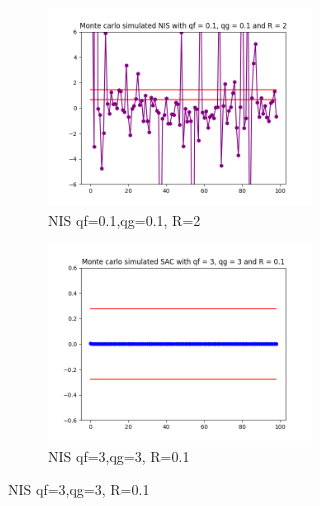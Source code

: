 \documentclass{article}
\begin{document}
\begin{figure}[H]
\begin{subfigure} {1\textwidth}
\begin{subfigure}{.3\textwidth}
                    \includegraphics[width=1\linewidth]{./img/mc/nis01r2.png}
                    \caption{NIS qf=0.1,qg=0.1, R=2}
                \end{subfigure}
                \begin{subfigure}{.3\textwidth}
                    \includegraphics[width=1\linewidth]{./img/mc/nis3r01.png}
                    \caption{NIS qf=3,qg=3, R=0.1}
                \end{subfigure}
            \end{subfigure} 
            \begin{subfigure}{1\textwidth}  
                \begin{subfigure}{.3\textwidth}  

\end{subfigure}
\end{subfigure}
\end{figure}
\end{document}
